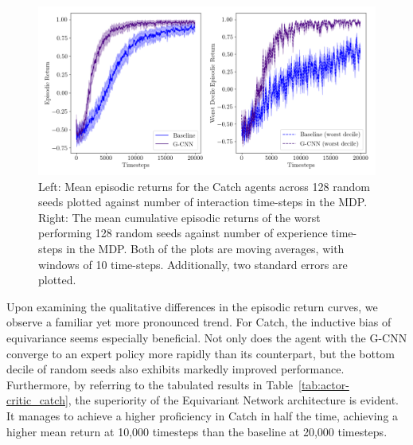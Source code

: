 \begin{figure}
	\centering
	\includegraphics[width=\linewidth]{Figures/catch_returns.png}
	\caption{Left: Mean episodic returns for the Catch agents across 128 random seeds plotted against number of interaction time-steps in the MDP. Right: The mean cumulative episodic returns of the worst performing 128 random seeds against number of experience time-steps in the MDP. Both of the plots are moving averages, with windows of 10 time-steps. Additionally, two standard errors are plotted.}
\end{figure}
Upon examining the qualitative differences in the episodic return curves, we observe a familiar yet more pronounced trend. For Catch, the inductive bias of equivariance seems especially beneficial. Not only does the agent with the G-CNN converge to an expert policy more rapidly than its counterpart, but the bottom decile of random seeds also exhibits markedly improved performance. Furthermore, by referring to the tabulated results in Table~\ref{tab:actor-critic_catch}, the superiority of the Equivariant Network architecture is evident. It manages to achieve a higher proficiency in Catch in half the time, achieving a higher mean return at 10,000 timesteps than the baseline at 20,000 timesteps.


